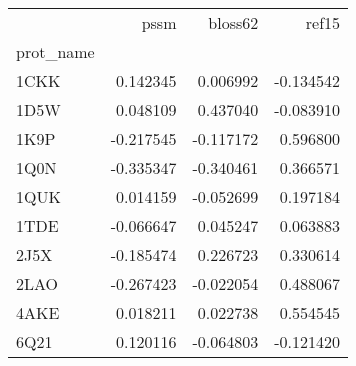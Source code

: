 \begin{tabular}{lrrr}
\toprule
{} &      pssm &   bloss62 &     ref15 \\
prot\_name &           &           &           \\
\midrule
1CKK      &  0.142345 &  0.006992 & -0.134542 \\
1D5W      &  0.048109 &  0.437040 & -0.083910 \\
1K9P      & -0.217545 & -0.117172 &  0.596800 \\
1Q0N      & -0.335347 & -0.340461 &  0.366571 \\
1QUK      &  0.014159 & -0.052699 &  0.197184 \\
1TDE      & -0.066647 &  0.045247 &  0.063883 \\
2J5X      & -0.185474 &  0.226723 &  0.330614 \\
2LAO      & -0.267423 & -0.022054 &  0.488067 \\
4AKE      &  0.018211 &  0.022738 &  0.554545 \\
6Q21      &  0.120116 & -0.064803 & -0.121420 \\
\bottomrule
\end{tabular}
